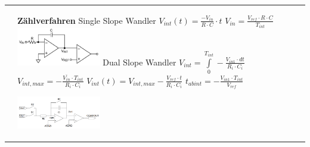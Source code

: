 \documentclass[margin=normal]{tex/hsrzf}
\begin{document}
\begin{tabular}{p{}p{}p{}}
{  }
   &
  \textbf{Zählverfahren}
  \newline Single Slope Wandler
  \newline $V_{int}(t) = \frac{-V_{in}}{R\cdot C}\cdot t$
  \newline $V_{in} = \frac{V_{ref} \cdot R \cdot C}{T_{int}}$
  \newline\includegraphics[width=0.3\textwidth]{img/ADC/SingleSlopeWandler.png}
  \newline Dual Slope Wandler
  \newline  $V_{int} = \int \limits ^{T_{int}} _0 -\frac{V_{in1}\cdot dt}{R_i \cdot C_i}$
  \newline $V_{int,max} = -\frac{\overline{V_{in}}\cdot T_{int}}{R_i \cdot C_i}$
  \newline $V_{int}(t) = V_{int,max}-\frac{V_{ref} \cdot t}{R_i \cdot C_i}$
  \newline $t_{abint} = -\frac{V_{in1}\cdot T_{int}}{V_{ref}}$

  \includegraphics[width=0.3\textwidth]{img/ADC/DualSlopeWandler.png}
\end{tabular}
\end{document}
